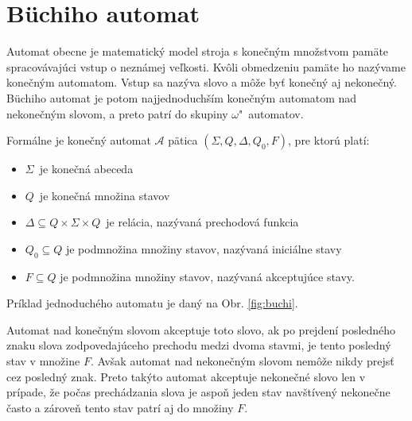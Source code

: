\documentclass[11pt,final,oneside]{fithesis}
\begin{document}
\section{B\"uchiho automat}	%
\label{sec:buchi}
Automat obecne je matematick\' y model stroja s kone\v cn\' ym mno\v zstvom pam\" ate spracov\' avaj\' uci vstup o nezn\' amej ve\v lkosti. 
Kv\^ oli obmedzeniu pam\" ate ho naz\' yvame kone\v cn\' ym automatom. Vstup sa naz\' yva slovo a m\^ o\v ze by\v t kone\v cn\' y aj nekone\v cn\' y.
B\" uchiho automat je potom najjednoduch\v s\' im kone\v cn\'ym automatom nad nekone\v cn\'ym slovom, a preto patr\'i do skupiny {$\omega$"~au\-to\-matov}.

Form\'alne je kone\v cn\' y automat $\mathcal{A}$ p\" atica $(\Sigma, Q, \Delta, Q_0, F)$, pre ktor\' u plat\'i:
\begin{itemize}
\item $\Sigma$\ je kone\v cn\'a abeceda
\item $Q$\ je kone\v cn\'a mno\v zina stavov
\item $\Delta \subseteq Q \times \Sigma \times Q$\ je rel\' acia, naz\'yvan\'a prechodov\'a funkcia
\item $Q_0 \subseteq Q$ je podmno\v zina mno\v ziny stavov, naz\' yvan\' a inici\' alne stavy
\item $F \subseteq Q$ je podmno\v zina mno\v ziny stavov, naz\'yvan\'a akceptuj\'uce stavy.
\end{itemize}
Pr\'iklad jednoduch\'eho automatu je dan\'y na Obr. \ref{fig:buchi}.

Automat nad kone\v cn\'ym slovom akceptuje toto slovo, ak po prejden\' i posledn\'eho znaku slova zodpovedaj\' uceho prechodu medzi dvoma stavmi, 
je tento posledn\' y stav v mno\v zine $F$. Av\v sak automat nad nekone\v cn\' ym slovom nem\^ o\v ze nikdy prejs\v t cez posledn\' y znak. Preto tak\' yto 
automat akceptuje nekone\v cn\' e slovo len v pr\' ipade, \v ze po\v cas prech\' adzania slova je aspo\v n jeden stav nav\v st\'iven\'y nekone\v cne \v casto 
a z\'arove\v n tento stav patr\'i aj do mno\v ziny $F$.
\end{document}
